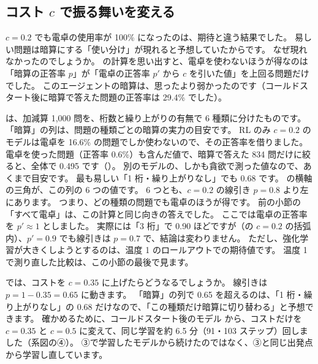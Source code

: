 \subsection{コスト $c$ で振る舞いを変える}

$c=0.2$ でも電卓の使用率が 100\% になったのは、期待と違う結果でした。
易しい問題は暗算にする「使い分け」が現れると予想していたからです。
なぜ現れなかったのでしょうか。
の計算を思い出すと、電卓を使わないほうが得なのは「暗算の正答率 $p$」が「電卓の正答率 $p'$ から $c$ を引いた値」を上回る問題だけでした。
このエージェントの暗算は、思ったより弱かったのです（コールドスタート後に暗算で答えた問題の正答率は 29.4\% でした）。

は、加減算 1,000 問を、桁数と繰り上がりの有無で 6 種類に分けたものです。
「暗算」の列は、問題の種類ごとの暗算の実力の目安です。
RL のみ $c=0.2$ のモデルは電卓を 16.6\% の問題でしか使わないので、その正答率を借りました。
電卓を使った問題（正答率 0.6\%）も含んだ値で、暗算で答えた 834 問だけに絞ると、全体で 0.495 です（）。
別のモデルの、しかも貪欲で測った値なので、あくまで目安です。
最も易しい「1 桁・繰り上がりなし」でも 0.68 です。
の横軸の三角が、この列の 6 つの値です。
6 つとも、$c=0.2$ の線引き $p=0.8$ より左にあります。
つまり、どの種類の問題でも電卓のほうが得です。
前の小節の「すべて電卓」は、この計算と同じ向きの答えでした。
ここでは電卓の正答率を $p'\approx1$ としました。
実際には「3 桁」で 0.90 ほどですが（の $c=0.2$ の括弧内）、$p'=0.9$ でも線引きは $p=0.7$ で、結論は変わりません。
ただし、強化学習が大きくしようとするのは、温度 1 のロールアウトでの期待値です。
温度 1 で測り直した比較は、この小節の最後で見ます。

では、コストを $c=0.35$ に上げたらどうなるでしょうか。
線引きは $p=1-0.35=0.65$ に動きます。
「暗算」の列で 0.65 を超えるのは、「1 桁・繰り上がりなし」の 0.68 だけなので、「この種類だけ暗算に切り替わる」と予想できます。
確かめるために、コールドスタート後のモデル  から、コストだけを $c=0.35$ と $c=0.5$ に変えて、同じ学習を約 6.5 分（91・103 ステップ）回しました（系図の④）。
③で学習したモデルから続けたのではなく、③と同じ出発点から学習し直しています。

